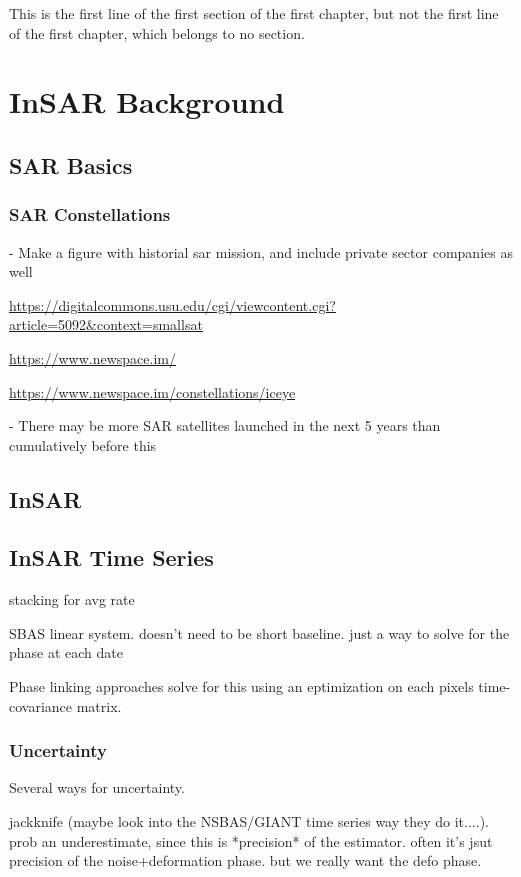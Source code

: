 \documentclass{utexasthesis}
\begin{document}
This is the first line of the first section of the first chapter, but not the first line of the first chapter, which belongs to no section.

\chapter{InSAR Background}

\section{SAR Basics}

\subsection{SAR Constellations}

- Make a figure with historial sar mission, and include private sector companies as well

\url{https://digitalcommons.usu.edu/cgi/viewcontent.cgi?article=5092&context=smallsat}

\url{https://www.newspace.im/ }

\url{https://www.newspace.im/constellations/iceye}


- There may be more SAR satellites launched in the next 5 years than cumulatively before this

\section{InSAR}

\section{InSAR Time Series}

stacking for avg rate

SBAS linear system. doesn't need to be short baseline. just a way to solve for the phase at each date

Phase linking approaches solve for this using an eptimization on each pixels time-covariance matrix.

\subsection{Uncertainty}

Several ways for uncertainty.

jackknife (maybe look into the NSBAS/GIANT time series way they do it....). prob an underestimate, since this is *precision* of the estimator. often it's jsut precision of the noise+deformation phase. but we really want the defo phase.
\end{document}
